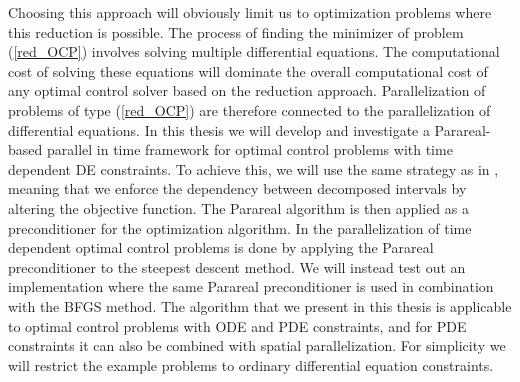 Choosing this approach will obviously limit us to optimization problems where this reduction is possible. The process of finding the minimizer of problem (\ref{red_OCP}) involves solving multiple differential equations. The computational cost of solving these equations will dominate the overall computational cost of any optimal control solver based on the reduction approach. Parallelization of problems of type (\ref{red_OCP}) are therefore connected to the parallelization of differential equations. In this thesis we will develop and investigate a Parareal-based parallel in time framework for optimal control problems with time dependent DE constraints. To achieve this, we will use the same strategy as in \cite{maday2002parareal}, meaning that we enforce the dependency between decomposed intervals by altering the objective function. The Parareal algorithm is then applied as a preconditioner for the optimization algorithm. In \cite{maday2002parareal} the parallelization of time dependent optimal control problems is done by applying the Parareal preconditioner to the steepest descent method. We will instead test out an implementation where the same Parareal preconditioner is used in combination with the BFGS method. The algorithm that we present in this thesis is applicable to optimal control problems with ODE and PDE constraints, and for PDE constraints it can also be combined with spatial parallelization. For simplicity we will restrict the example problems to ordinary differential equation constraints.

